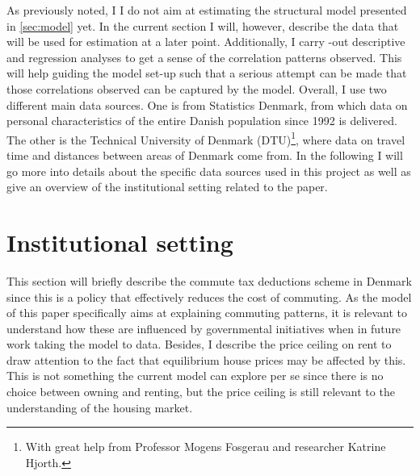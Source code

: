 As previously noted, I I do not aim at estimating the structural model presented in \autoref{sec:model} yet. In the current section I will, however, describe the data that will be used for estimation at a later point. Additionally, I carry -out descriptive and regression analyses to get a sense of the correlation patterns observed. This will help guiding the model set-up such that a serious attempt can be made that those correlations observed can be captured by the model. Overall, I use two different main data sources. One is from Statistics Denmark, from which data on personal characteristics of the entire Danish population since 1992 is delivered. The other is the Technical University of Denmark (DTU)\footnote{With great help from Professor Mogens Fosgerau and researcher Katrine Hjorth.}, where data on travel time and distances between areas of Denmark come from. In the following I will go more into details about the specific data sources used in this project as well as give an overview of the institutional setting related to the paper.

\section{Institutional setting}\label{subsec:instset}
This section will briefly describe the commute tax deductions scheme in Denmark since this is a policy that effectively reduces the cost of commuting. As the model of this paper specifically aims at explaining commuting patterns, it is relevant to understand how these are influenced by governmental initiatives when in future work taking the model to data. Besides, I describe the price ceiling on rent to draw attention to the fact that equilibrium house prices may be affected by this. This is not something the current model can explore per se since there is no choice between owning and renting, but the price ceiling is still relevant to the understanding of the housing market.

